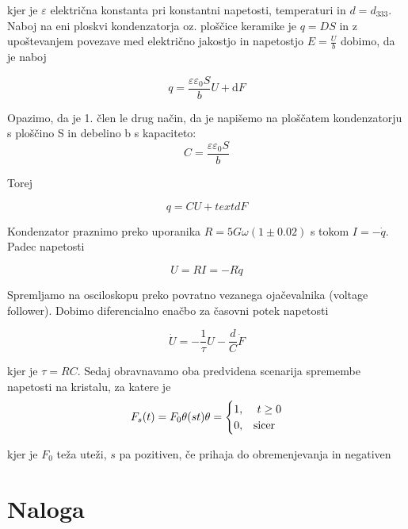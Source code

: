 \documentclass[12pt]{report}
\begin{document}
kjer je $\varepsilon$ električna konstanta pri konstantni napetosti, temperaturi in $d=d_{333}$. Naboj na eni ploskvi kondenzatorja oz. ploščice keramike je $q = DS$ in z upoštevanjem povezave med električno jakostjo in napetostjo $E= \frac{U}{b}$ dobimo, da je naboj

\begin{equation}
  q = \frac{\varepsilon \varepsilon_0 S}{b} U + \text{d}F
\end{equation}

Opazimo, da je 1. člen le drug način, da je napišemo na ploščatem kondenzatorju s ploščino S in debelino b s kapaciteto: 
\begin{equation}
  C = \frac{\varepsilon \varepsilon_0 S}{b}
\end{equation}

Torej 

\begin{equation} 
  q = CU + text{d}F
\end{equation}

Kondenzator praznimo preko uporanika $R = 5G\omega (1 \pm 0.02)$  s tokom $I = -\dot{q}$. Padec napetosti

\begin{equation}
  U = RI = -R\dot{q}
\end{equation}

Spremljamo na osciloskopu preko povratno vezanega ojačevalnika (voltage follower). Dobimo diferencialno enačbo za časovni potek napetosti

\begin{equation}
  \dot{U} = -\frac{1}{\tau} U - \frac{d}{C}\dot{F}
\end{equation}

kjer je $\tau = RC$. Sedaj obravnavamo oba predvidena scenarija spremembe napetosti na kristalu, za katere je 
\begin{equation}
  F_s(t) = F_0 \theta(st)\\
  \theta = 
  \begin{cases}
    1, & \ t \geq 0 \\
    0, & \text{sicer}
  \end{cases}
\end{equation}

kjer je $F_0$ teža uteži, $s$ pa pozitiven, če prihaja do obremenjevanja in negativen

\chapter*{Naloga}
\end{document}
